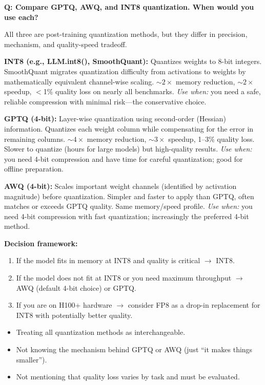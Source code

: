 \begin{interviewq}
\textbf{Q: Compare GPTQ, AWQ, and INT8 quantization.  When would you use each?}

 \quad {} \quad \badgefreq{\freqmed}

\stronganswer
All three are post-training quantization methods, but they differ in precision,
mechanism, and quality-speed tradeoff.

\textbf{INT8 (e.g., LLM.int8(), SmoothQuant):}  Quantizes weights to 8-bit integers.
SmoothQuant migrates quantization difficulty from activations to weights by mathematically
equivalent channel-wise scaling.  $\sim$$2\times$ memory reduction, $\sim$$2\times$ speedup,
$<$1\% quality loss on nearly all benchmarks.  \emph{Use when:} you need a safe,
reliable compression with minimal risk---the conservative choice.

\textbf{GPTQ (4-bit):}  Layer-wise quantization using second-order (Hessian) information.
Quantizes each weight column while compensating for the error in remaining columns.
$\sim$$4\times$ memory reduction, $\sim$$3\times$ speedup, 1--3\% quality loss.  Slower
to quantize (hours for large models) but high-quality results.  \emph{Use when:} you need
4-bit compression and have time for careful quantization; good for offline preparation.

\textbf{AWQ (4-bit):}  Scales important weight channels (identified by activation
magnitude) before quantization.  Simpler and faster to apply than GPTQ, often matches or
exceeds GPTQ quality.  Same memory/speed profile.  \emph{Use when:} you need 4-bit
compression with fast quantization; increasingly the preferred 4-bit method.

\textbf{Decision framework:}
\begin{enumerate}
    \item If the model fits in memory at INT8 and quality is critical $\to$ INT8.
    \item If the model does not fit at INT8 or you need maximum throughput $\to$ AWQ
          (default 4-bit choice) or GPTQ.
    \item If you are on H100+ hardware $\to$ consider FP8 as a drop-in replacement for
          INT8 with potentially better quality.
\end{enumerate}

\redflags
\begin{itemize}
    \item Treating all quantization methods as interchangeable.
    \item Not knowing the mechanism behind GPTQ or AWQ (just ``it makes things smaller'').
    \item Not mentioning that quality loss varies by task and must be evaluated.
\end{itemize}


\end{interviewq}
